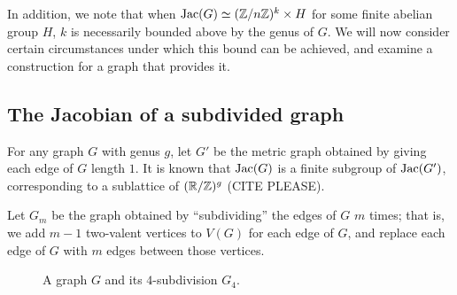 \documentclass{amsart}
\begin{document}
In addition, we note that when $\operatorname{Jac}(G) \simeq (\mathbb{Z}/n\mathbb{Z})^k \times H$
for some finite abelian group $H$, $k$ is necessarily bounded above by
the genus of $G$. We will now consider certain circumstances under
which this bound can be achieved, and examine a construction for a
graph that provides it.

\subsection{The Jacobian of a subdivided graph}

For any graph $G$ with genus $g$, let $G'$ be the metric graph
obtained by giving each edge of $G$ length $1$. It is known that
$\operatorname{Jac}(G)$ is a finite subgroup of $\operatorname{Jac}(G')$, corresponding to a
sublattice of $(\mathbb{R}/\mathbb{Z})^g$ (CITE PLEASE).

Let $G_m$ be the graph obtained by ``subdividing'' the edges of $G$
$m$ times; that is, we add $m-1$ two-valent vertices to $V(G)$ for
each edge of $G$, and replace each edge of $G$ with $m$ edges between
those vertices. 

\begin{figure}[H]
  \begin{center}
  \end{center}
  \caption{A graph $G$ and its $4$-subdivision $G_4$.}
\end{figure}
\end{document}
